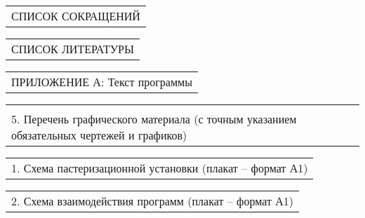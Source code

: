 \documentclass[12pt, А4, twoside]{article}
\begin{document}
\begin{FlushLeft}
    \vspace{-0.1 cm}

    \begin{tabular}{p{17.25cm}} 
        \textsf{СПИСОК СОКРАЩЕНИЙ} \vspace{0pt} \hline \\
    \end{tabular}  

    \vspace{-0.1 cm}

    \begin{tabular}{p{17.25cm}} 
        \textsf{СПИСОК ЛИТЕРАТУРЫ} \vspace{1pt} \hline  \\
    \end{tabular}  

    \vspace{-0.1 cm}

    \begin{tabular}{p{17.25cm}} 
        \textsf{ПРИЛОЖЕНИЕ А: Текст программы} \vspace{1pt} \hline  \\
    \end{tabular}
    
    \vspace{-0.1 cm}

    \begin{tabular}{p{17.25cm}} 
        \vspace{0pt} \hline \\
        \textsf{5. Перечень графического материала (с точным указанием обязательных чертежей и графиков)} \vspace{0pt} \hline \\
    \end{tabular} 
    
    \vspace{-0.1 cm}

    \begin{tabular}{p{17.25cm}} 
        \hspace{0.3cm} \textsf{1. Схема пастеризационной установки (плакат {--} формат А1)} \vspace{0pt} \hline  \\
    \end{tabular} 
    
    \vspace{-0.1 cm}

    \begin{tabular}{p{17.25cm}} 
        \hspace{0.3cm} \textsf{2. Схема взаимодействия программ (плакат {--} формат А1)} \vspace{0pt} \hline  \\
    \end{tabular} 
    

\end{FlushLeft}
\end{document}

